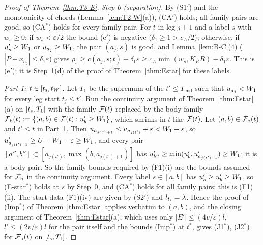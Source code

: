 \begin{proof}[Proof of Theorem~\ref{thm:T3-E}]
\emph{Step 0 (separation).} By (S1$'$) and the monotonicity of chords (Lemma~\ref{lem:T2-W}(a)), (CA$'$) holds; all family pairs
are good, so (CA$^*$) holds for every family pair. For $t$ in leg $j+1$ and a label $s$ with $w_s\ge0$: if
$w_s<\varepsilon/2$ the bound (e$'$) is negative ($\delta_1\ge1>c_A/2$); otherwise, if $u_s'\ge W_1$ or $u_{a_j}\ge W_1$, the
pair $(a_j,s)$ is good, and Lemma~\ref{lem:B-C}(4) ($|P-x_{a_j}|\le\delta_1\varepsilon$) gives
$\rho_s\ge c(a_j,s;t)-\delta_1\varepsilon\ge c_A\min(w_s,K_RR)-\delta_1\varepsilon$. This is (e$'$); it is Step~1(d) of the proof
of Theorem~\ref{thm:Estar} for these labels.

\emph{Part 1: $t\in[t_{\mathrm s},t_W]$.} Let $T_1$ be the supremum of the $t'\le T_{\mathrm{end}}$ such that $u_{a_j}<W_1$ for every
leg start $t_j\le t'$. Run the continuity argument of Theorem~\ref{thm:Estar}(a) on $[t_{\mathrm s},T_1]$ with the family $\mathcal F(t)$ replaced
by the body family $\mathcal F_{\mathrm b}(t):=\{(a,b)\in\mathcal F(t):u_b'\ge W_1\}$, which shrinks in $t$ like $\mathcal F(t)$. Let $(a,b)\in\mathcal F_{\mathrm b}(t)$ and
$t'\le t$ in Part~1. Then $u_{a_{j(t')+1}}\le u_{a_{j(t')}}+\varepsilon<W_1+\varepsilon$, so
$u'_{a_{j(t')+1}}\ge U-W_1-\varepsilon\ge W_1$, and every pair $[a'',b'']\subset[a_{j(t')},\max(b,a_{j(t')+1})]$ has
$u'_{b''}\ge\min(u_b',u'_{a_{j(t')+1}})\ge W_1$: it is a body pair. So the family bounds required by (F1)(i) are the bounds
assumed for $\mathcal F_{\mathrm b}$ in the continuity argument. Every label $s\in[a,b]$ has $u_s'\ge u_b'\ge W_1$, so (E-star$^*$) holds at $s$
by Step~0, and (CA$^*$) holds for all family pairs: this is (F1)(ii). The start data (F1)(iv) are given by (S2$'$) and
$l_{t_{\mathrm s}}=\lambda$. Hence the proof of (Imp$^*$) of Theorem~\ref{thm:Estar} applies verbatim to $(a,b)$, and the closing argument of
Theorem~\ref{thm:Estar}(a), which uses only $|E'|\le(4v/\varepsilon)l$, $l'\le(2v/\varepsilon)l$ for the pair itself and the
bounds (Imp$^*$) at $t^*$, gives (J1$^*$), (J2$^*$) for $\mathcal F_{\mathrm b}(t)$ on $[t_{\mathrm s},T_1]$.


\end{proof}
